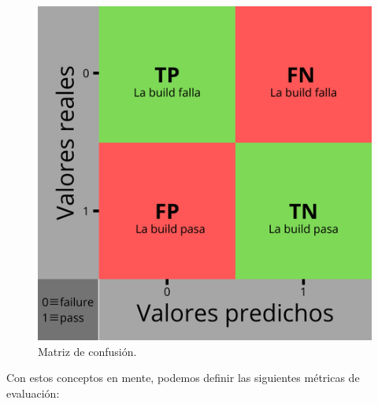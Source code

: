 \begin{figure}[h]
      \centering
      \includegraphics[scale=0.50]{images/Confusion matrix.png}
      \caption{Matriz de confusión.}
      \label{fig:confusion_matrix}
  \end{figure}

Con estos conceptos en mente, podemos definir las siguientes métricas de evaluación:

